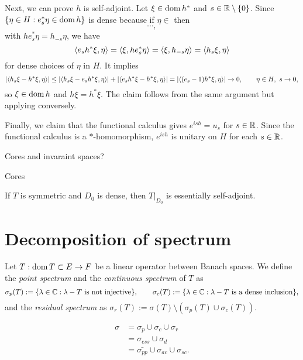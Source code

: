 \documentclass{../../large}
\begin{document}
\begin{pf}
Next, we can prove $h$ is self-adjoint.
Let $\xi\in\operatorname{dom} h^*$ and $s\in\mathbb{R}\setminus\{0\}$.
Since $\{\eta\in H:e_s^*\eta\in\operatorname{dom} h\}$ is dense because if $\eta\in$ then
\[\cdots,\]
with $he_s^*\eta=h_{-s}\eta$, we have
\[\langle e_sh^*\xi,\eta\rangle=\langle\xi,he_s^*\eta\rangle=\langle\xi,h_{-s}\eta\rangle=\langle h_s\xi,\eta\rangle\]
for dense choices of $\eta$ in $H$.
It implies
\[|\langle h_s\xi-h^*\xi,\eta\rangle|\le|\langle h_s\xi-e_sh^*\xi,\eta\rangle|+|\langle e_sh^*\xi-h^*\xi,\eta\rangle|=|\langle(e_s-1)h^*\xi,\eta\rangle|\to0,\qquad\eta\in H,\ s\to0,\]
so $\xi\in\operatorname{dom} h$ and $h\xi=h^*\xi$.
The claim follows from the same argument but applying conversely.

Finally, we claim that the functional calculus gives $e^{ish}=u_s$ for $s\in\mathbb{R}$.
Since the functional calculus is a $*$-homomorphism, $e^{ish}$ is unitary on $H$ for each $s\in\mathbb{R}$.
\end{pf}

Cores and invaraint spaces?


\begin{prb}
Cores
\begin{parts}
\item If $T$ is symmetric and $D_0$ is dense, then $T|_{D_0}$ is essentially self-adjoint.
\end{parts}
\end{prb}

\begin{prb}
\end{prb}








\section{Decomposition of spectrum}

\begin{prb}
Let $T:\operatorname{dom} T\subset E\to F$ be a linear operator between Banach spaces.
We define the \emph{point spectrum} and the \emph{continuous spectrum} of $T$ as
\[\sigma_p(T):=\{\lambda\in\mathbb{C}:\lambda-T\text{ is not injective}\},\qquad
\sigma_c(T):=\{\lambda\in\mathbb{C}:\lambda-T\text{ is a dense inclusion}\},\]
and the \emph{residual spectrum} as $\sigma_r(T):=\sigma(T)\setminus(\sigma_p(T)\cup\sigma_c(T))$.
\end{prb}

\begin{align*}
\sigma
&=\sigma_p\cup\sigma_c\cup\sigma_r\\
&=\sigma_{ess}\cup\sigma_d\\
&=\bar{\sigma_{pp}}\cup\sigma_{ac}\cup\sigma_{sc}.
\end{align*}
\end{document}
